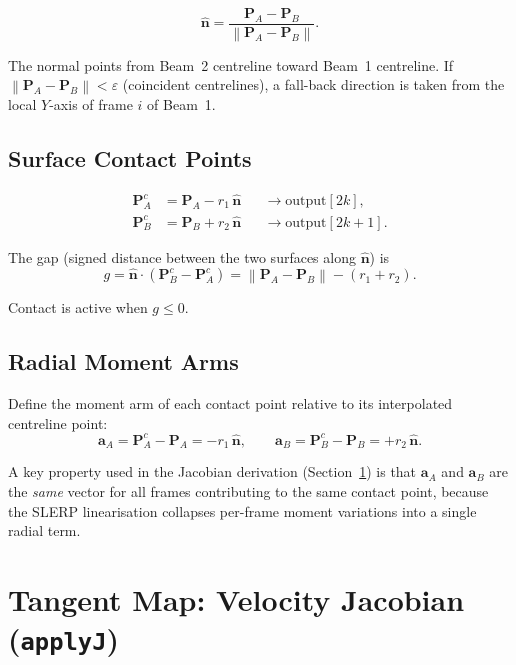 \documentclass[11pt, a4paper]{article}
\newcommand{\vv}[1]{\bm{#1}}
\newcommand{\nn}{\hat{\vv{n}}}
\newcommand{\norm}[1]{\left\|#1\right\|}
\begin{document}
\begin{equation}
  \nn = \frac{\vv{P}_A - \vv{P}_B}{\norm{\vv{P}_A - \vv{P}_B}}.
  \label{eq:normal}
\end{equation}

The normal points from Beam~2 centreline toward Beam~1 centreline.
If $\norm{\vv{P}_A - \vv{P}_B} < \varepsilon$ (coincident centrelines),
a fall-back direction is taken from the local $Y$-axis of frame $i$ of Beam~1.

\subsection{Surface Contact Points}

\begin{align}
  \vv{P}^c_A &= \vv{P}_A - r_1\,\nn
  && \rightarrow \text{output}[2k],
  \label{eq:PcA}\\
  \vv{P}^c_B &= \vv{P}_B + r_2\,\nn
  && \rightarrow \text{output}[2k+1].
  \label{eq:PcB}
\end{align}

The gap (signed distance between the two surfaces along $\nn$) is
\begin{equation}
  g = \nn \cdot (\vv{P}^c_B - \vv{P}^c_A)
    = \norm{\vv{P}_A - \vv{P}_B} - (r_1 + r_2).
  \label{eq:gap}
\end{equation}

Contact is active when $g \leq 0$.

\subsection{Radial Moment Arms}

Define the moment arm of each contact point relative to its interpolated
centreline point:
\begin{equation}
  \vv{a}_A = \vv{P}^c_A - \vv{P}_A = -r_1\,\nn,
  \qquad
  \vv{a}_B = \vv{P}^c_B - \vv{P}_B = +r_2\,\nn.
  \label{eq:arms}
\end{equation}

A key property used in the Jacobian derivation (Section~\ref{sec:jacobian})
is that $\vv{a}_A$ and $\vv{a}_B$ are the \emph{same} vector for all
frames contributing to the same contact point, because the SLERP
linearisation collapses per-frame moment variations into a single radial term.

\section{Tangent Map: Velocity Jacobian (\texttt{applyJ})}
\label{sec:jacobian}
\end{document}
